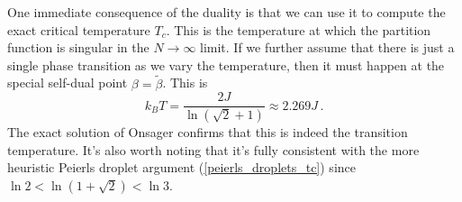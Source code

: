 \documentclass{article}
\theoremstyle{plain}\theoremheaderfont{\normalfont\bfseries}\theorembodyfont{\rmfamily}\theoremseparator{.}\newtheorem*{thm}{Theorem}\newtheorem*{law}{Law}\newtheorem*{pos}{Postulate}
\numberwithin{equation}{section}
\begin{document}
    One immediate consequence of the duality is that we can use it to compute the exact critical temperature \(T_c\). This is the temperature at which the partition function is singular in the \(N\to\infty\) limit. If we further assume that there is just a single phase transition as we vary the temperature, then it must happen at the special self-dual point \(\beta=\tilde{\beta}\). This is
    \begin{equation}
        k_B T=\frac{2J}{\ln(\sqrt{2}+1)}\approx 2.269J\,.
    \end{equation}
    The exact solution of Onsager confirms that this is indeed the transition temperature. It's also worth noting that it's fully consistent with the more heuristic Peierls droplet argument (\ref{peierls_droplets_tc}) since \(\ln 2 < \ln(1+\sqrt{2}) < \ln 3\).
\end{document}
